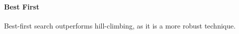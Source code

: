 \paragraph{Best First}
\label{par:methods.flat.wrapper.best_first}

  
Best-first search outperforms hill-climbing, as it is a more robust technique. \cite{Kohavi:97}